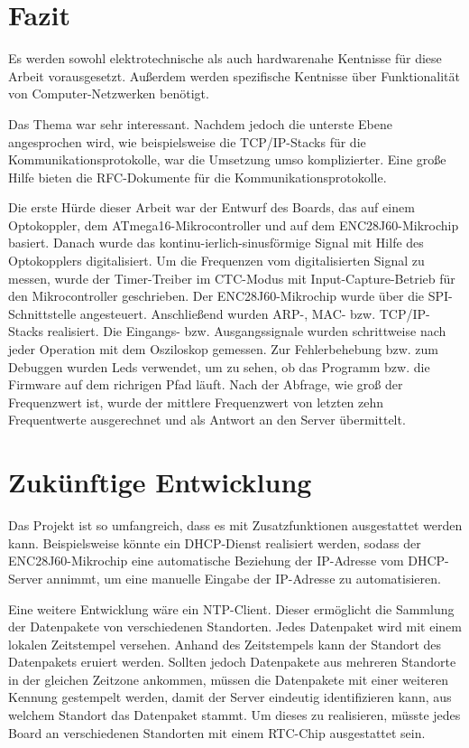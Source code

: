 \chapter{Fazit}

Es werden sowohl elektrotechnische als auch hardwarenahe Kentnisse für diese Arbeit vorausgesetzt. Außerdem werden spezifische Kentnisse über Funktionalität von Computer-Netzwerken benötigt. \smallskip \smallskip

Das Thema war sehr interessant. Nachdem jedoch die unterste Ebene angesprochen wird, wie beispielsweise die TCP/IP-Stacks für die Kommunikationsprotokolle, war die Umsetzung umso komplizierter. Eine große Hilfe bieten die RFC-Dokumente für die Kommunikationsprotokolle. \smallskip \smallskip

Die erste Hürde dieser Arbeit war der Entwurf des Boards, das auf einem Optokoppler, dem ATmega16-Mikrocontroller und auf dem ENC28J60-Mikrochip basiert. Danach wurde das kontinu-ierlich-sinusförmige Signal mit Hilfe des Optokopplers digitalisiert. Um die Frequenzen vom digitalisierten Signal zu messen, wurde der Timer-Treiber im CTC-Modus mit Input-Capture-Betrieb für den Mikrocontroller geschrieben. Der ENC28J60-Mikrochip wurde über die SPI-Schnittstelle angesteuert. Anschließend wurden ARP-, MAC- bzw. TCP/IP-Stacks realisiert. Die Eingangs- bzw. Ausgangssignale wurden schrittweise nach jeder Operation mit dem Osziloskop gemessen. Zur Fehlerbehebung bzw. zum Debuggen wurden Leds verwendet, um zu sehen, ob das Programm bzw. die Firmware auf dem richrigen Pfad läuft. Nach der Abfrage, wie groß der Frequenzwert ist, wurde der mittlere Frequenzwert von letzten zehn Frequentwerte ausgerechnet und als Antwort an den Server übermittelt. \smallskip \smallskip

\chapter{Zukünftige Entwicklung}

Das Projekt ist so umfangreich, dass es mit Zusatzfunktionen ausgestattet werden kann. Beispielsweise könnte ein DHCP-Dienst realisiert werden, sodass der ENC28J60-Mikrochip eine automatische Beziehung der IP-Adresse vom DHCP-Server annimmt, um eine manuelle Eingabe der IP-Adresse zu automatisieren. \smallskip \smallskip

Eine weitere Entwicklung wäre ein NTP-Client. Dieser ermöglicht die Sammlung der Datenpakete von verschiedenen Standorten. Jedes Datenpaket wird mit einem lokalen Zeitstempel versehen. Anhand des Zeitstempels kann der Standort des Datenpakets eruiert werden. Sollten jedoch Datenpakete aus mehreren Standorte in der gleichen Zeitzone ankommen, müssen die Datenpakete mit einer weiteren Kennung gestempelt werden, damit der Server eindeutig identifizieren kann, aus welchem Standort das Datenpaket stammt. Um dieses zu realisieren, müsste jedes Board an verschiedenen Standorten mit einem RTC-Chip ausgestattet sein. \smallskip \smallskip

